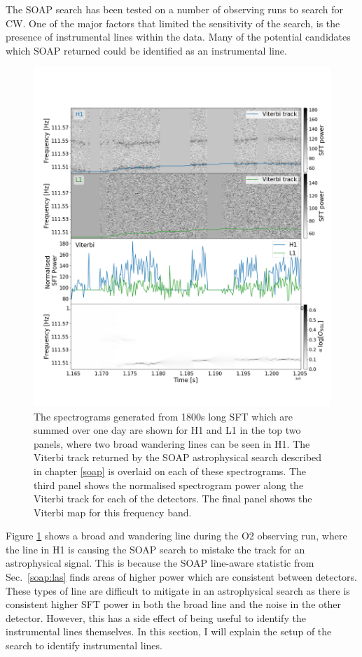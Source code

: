 % 
The SOAP search has been tested on a number of observing runs
to search for \gls{CW}.  One of the major factors that limited the sensitivity
of the search, is the presence of instrumental lines within the data.  Many of
the potential candidates which SOAP returned could be identified as an
instrumental line.
%
\begin{figure}[hp]
	\includegraphics[width=\textwidth]{C6_detchar/plot_F111_5_wandering_line.png}
        \caption[Broad wandering line example.]{ The spectrograms generated from 1800s long \gls{SFT} which are summed over one day are shown for H1 and L1 in the top two panels, where two broad wandering lines can be seen in H1.
        The Viterbi track returned by the SOAP astrophysical search described in chapter \ref{soap} is overlaid on each of these spectrograms.
        The third panel shows the normalised spectrogram power along the Viterbi track for each of the detectors. The final
        panel shows the Viterbi map for this frequency band.
			}
\label{detchar:soap:astrowander}

\end{figure}
%
Figure \ref{detchar:soap:astrowander} shows a broad and wandering line during the O2 observing run, where the line in H1 is causing the SOAP search to mistake the track for an astrophysical signal.
This is because the SOAP line-aware statistic from Sec.~\ref{soap:las} finds
areas of higher power which are consistent between detectors. These types of line are difficult to mitigate in an astrophysical
search as there is consistent higher \gls{SFT} power in both the broad line and the noise in the other detector.
However, this has a side effect of being useful to identify the
instrumental lines themselves.
In this section, I will explain the setup of the search to identify
instrumental lines.

